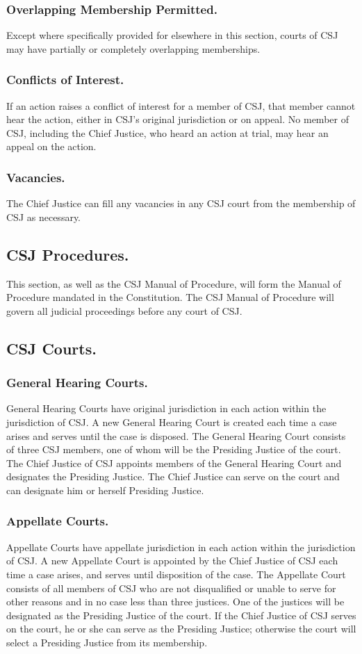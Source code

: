 \subsubsection{Overlapping Membership Permitted.}
Except where specifically provided for elsewhere in this section, courts of CSJ may have partially or completely overlapping memberships.
\subsubsection{Conflicts of Interest.}
If an action raises a conflict of interest for a member of CSJ, that member cannot hear the action, either in CSJ's original jurisdiction or on appeal.  No member of CSJ, including the Chief Justice, who heard an action at trial, may hear an appeal on the action.
\subsubsection{Vacancies.}
The Chief Justice can fill any vacancies in any CSJ court from the membership of CSJ as necessary.

\subsection{CSJ Procedures.}
This section, as well as the CSJ Manual of Procedure, will form the Manual of Procedure mandated in the Constitution.  The CSJ Manual of Procedure will govern all judicial proceedings before any court of CSJ.

\subsection{CSJ Courts.}
\subsubsection{General Hearing Courts.}
General Hearing Courts have original jurisdiction in each action within the jurisdiction of CSJ.  A new General Hearing Court is created each time a case arises and serves until the case is disposed.  The General Hearing Court consists of three CSJ members, one of whom will be the Presiding Justice of the court.  The Chief Justice of CSJ appoints members of the General Hearing Court and designates the Presiding Justice.  The Chief Justice can serve on the court and can designate him or herself Presiding Justice.
\subsubsection{Appellate Courts.}
Appellate Courts have appellate jurisdiction in each action within the jurisdiction of CSJ.  A new Appellate Court is appointed by the Chief Justice of CSJ each time a case arises, and serves until disposition of the case.  The Appellate Court consists of all members of CSJ who are not disqualified or unable to serve for other reasons and in no case less than three justices.  One of the justices will be designated as the Presiding Justice of the court.  If the Chief Justice of CSJ serves on the court, he or she can serve as the Presiding Justice; otherwise the court will select a Presiding Justice from its membership.
